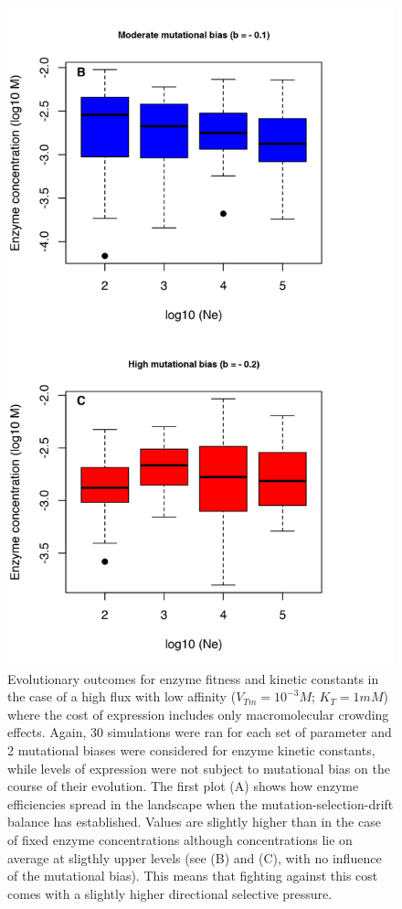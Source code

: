 \begin{figure}[h!]
\begin{center}
\begin{minipage}[c]{0.575\textwidth}
    \includegraphics[scale=0.6,trim=0cm 0cm 1cm 0cm,clip]{pics/SM-Enzymes/Evo_Conc_Results_Crowding.jpeg}
  \end{minipage}\hfill
  \begin{minipage}[c]{0.375\textwidth}
    \caption{\small Evolutionary outcomes for enzyme fitness and kinetic constants in the case of a high flux with low affinity ($V_{Tm}=10^{-3}M$; $K_T=1 mM$) where the cost of expression includes only macromolecular crowding effects. Again, 30 simulations were ran for each set of parameter and 2 mutational biases were considered for enzyme kinetic constants, while levels of expression were not subject to mutational bias on the course of their evolution. The first plot (A) shows how enzyme efficiencies spread in the landscape when the mutation-selection-drift balance has established. Values are slightly higher than in the case of fixed enzyme concentrations although concentrations lie on average at sligthly upper levels (see (B) and (C), with no influence of the mutational bias). This means that fighting against this cost comes with a slightly higher directional selective pressure. \normalsize}

\end{minipage}
\end{center}
\end{figure}
